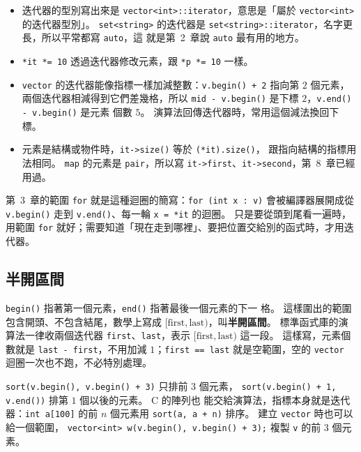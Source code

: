
\begin{itemize}
\item 迭代器的型別寫出來是 \texttt{vector<int>::iterator}，意思是「屬於
\texttt{vector<int>} 的迭代器型別」。 \texttt{set<string>} 的迭代器是
\texttt{set<string>::iterator}，名字更長，所以平常都寫 \texttt{auto}，這
就是第~2~章說 \texttt{auto} 最有用的地方。
\item \texttt{*it *= 10} 透過迭代器修改元素，跟 \texttt{*p *= 10} 一樣。
\item \texttt{vector} 的迭代器能像指標一樣加減整數：\texttt{v.begin() + 2}
指向第 $2$ 個元素，兩個迭代器相減得到它們差幾格，所以
\texttt{mid - v.begin()} 是下標 $2$，\texttt{v.end() - v.begin()} 是元素
個數 $5$。 演算法回傳迭代器時，常用這個減法換回下標。
\item 元素是結構或物件時，\texttt{it->size()} 等於 \texttt{(*it).size()}，
跟指向結構的指標用法相同。 \texttt{map} 的元素是 \texttt{pair}，所以寫
\texttt{it->first}、\texttt{it->second}，第~8~章已經用過。
\end{itemize}

第~3~章的範圍 \texttt{for} 就是這種迴圈的簡寫：\texttt{for (int x : v)}
會被編譯器展開成從 \texttt{v.begin()} 走到 \texttt{v.end()}、每一輪
\texttt{x = *it} 的迴圈。 只是要從頭到尾看一遍時，用範圍 \texttt{for}
就好；需要知道「現在走到哪裡」、要把位置交給別的函式時，才用迭代器。

\subsection{半開區間}

\texttt{begin()} 指著第一個元素，\texttt{end()} 指著最後一個元素的下一
格。 這樣圍出的範圍包含開頭、不包含結尾，數學上寫成 $[\text{first},
\text{last})$，叫\textbf{半開區間}。 標準函式庫的演算法一律收兩個迭代器
\texttt{first}、\texttt{last}，表示 $[\text{first}, \text{last})$ 這一段。
這樣寫，元素個數就是 \texttt{last - first}，不用加減 $1$；\texttt{first
== last} 就是空範圍，空的 \texttt{vector} 迴圈一次也不跑，不必特別處理。

 \texttt{sort(v.begin(), v.begin() + 3)} 只排前 $3$ 個元素，
\texttt{sort(v.begin() + 1, v.end())} 排第 $1$ 個以後的元素。 C 的陣列也
能交給演算法，指標本身就是迭代器：\texttt{int a[100]} 的前 $n$ 個元素用
\texttt{sort(a, a + n)} 排序。 建立 \texttt{vector} 時也可以給一個範圍，
\texttt{vector<int> w(v.begin(), v.begin() + 3);} 複製 \texttt{v} 的前
$3$ 個元素。

